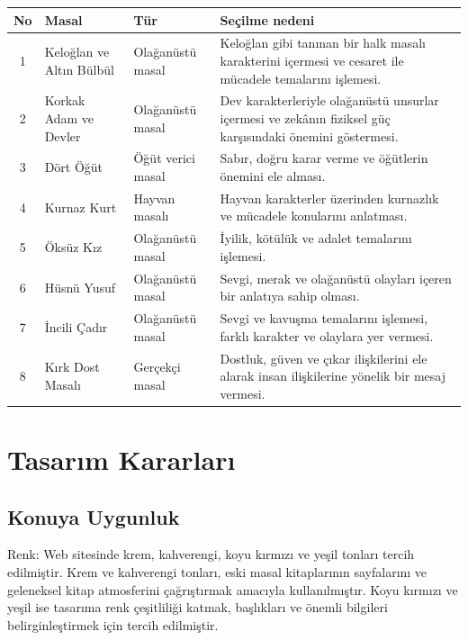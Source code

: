 \documentclass[12pt,a4paper]{article}
\begin{document}
\begin{longtable}{@{}cp{4cm}p{3cm}p{5.4cm}@{}}
\toprule
\textbf{No} & \textbf{Masal} & \textbf{Tür} & \textbf{Seçilme nedeni} \\
\midrule
\endhead
1 & Keloğlan ve Altın Bülbül & Olağanüstü masal & Keloğlan gibi tanınan bir halk masalı karakterini içermesi ve cesaret ile mücadele temalarını işlemesi. \\
2 & Korkak Adam ve Devler & Olağanüstü masal & Dev karakterleriyle olağanüstü unsurlar içermesi ve zekânın fiziksel güç karşısındaki önemini göstermesi. \\
3 & Dört Öğüt & 	Öğüt verici masal & Sabır, doğru karar verme ve öğütlerin önemini ele alması. \\
4 & Kurnaz Kurt& Hayvan masalı & Hayvan karakterler üzerinden kurnazlık ve mücadele konularını anlatması. \\
5 & Öksüz Kız & 	Olağanüstü masal & İyilik, kötülük ve adalet temalarını işlemesi. \\
6 & Hüsnü Yusuf & Olağanüstü masal & Sevgi, merak ve olağanüstü olayları içeren bir anlatıya sahip olması. \\
7 & İncili Çadır & Olağanüstü masal & Sevgi ve kavuşma temalarını işlemesi, farklı karakter ve olaylara yer vermesi. \\
8 & Kırk Dost Masalı& Gerçekçi masal & Dostluk, güven ve çıkar ilişkilerini ele alarak insan ilişkilerine yönelik bir mesaj vermesi. \\

\bottomrule
\end{longtable}

\section{Tasarım Kararları}

\subsection{Konuya Uygunluk}
Renk: Web sitesinde krem, kahverengi, koyu kırmızı ve yeşil tonları tercih edilmiştir. Krem ve kahverengi tonları, eski masal kitaplarının sayfalarını ve geleneksel kitap atmosferini çağrıştırmak amacıyla kullanılmıştır. Koyu kırmızı ve yeşil ise tasarıma renk çeşitliliği katmak, başlıkları ve önemli bilgileri belirginleştirmek için tercih edilmiştir.
\end{document}

